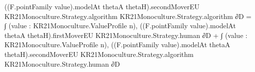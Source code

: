 \documentclass[10pt]{article}
\begin{document}
\begin{ReviewVerbatim}
                                              ((F.pointFamily value).modelAt thetaA thetaH).secondMoverEU
                                                KR21Monoculture.Strategy.algorithm
                                                KR21Monoculture.Strategy.algorithm ∂D =
                                          ∫ (value : KR21Monoculture.ValueProfile n),
                                              ((F.pointFamily value).modelAt thetaA thetaH).firstMoverEU
                                                KR21Monoculture.Strategy.human ∂D +
                                            ∫ (value : KR21Monoculture.ValueProfile n),
                                              ((F.pointFamily value).modelAt thetaA thetaH).secondMoverEU
                                                KR21Monoculture.Strategy.algorithm KR21Monoculture.Strategy.human ∂D
\end{ReviewVerbatim}
\end{document}
